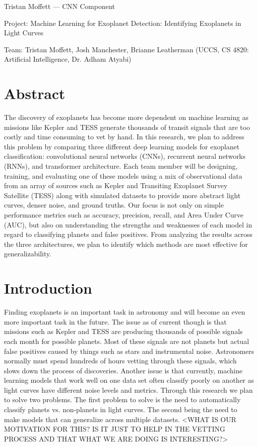 \documentclass[letterpaper]{article}
\title{}
\author{}
\begin{document}
\maketitle
Tristan Moffett — CNN Component

Project: Machine Learning for Exoplanet Detection: Identifying Exoplanets in Light Curves

Team: Tristan Moffett, Josh Manchester, Brianne Leatherman (UCCS, CS 4820: Artificial Intelligence, Dr. Adham Atyabi)

\section*{Abstract}
The discovery of exoplanets has become more dependent on machine learning as missions like Kepler and TESS generate thousands of transit signals that are too costly and time consuming to vet by hand. In this research, we plan to address this problem by comparing three different deep learning models for exoplanet classification: convolutional neural networks (CNNs), recurrent neural networks (RNNs), and transformer architecture. Each team member will be designing, training, and evaluating one of these models using a mix of observational data from an array of sources such as Kepler and Transiting Exoplanet Survey Satellite (TESS) along with simulated datasets to provide more abstract light curves, denser noise, and ground truths. Our focus is not only on simple performance metrics such as accuracy, precision, recall, and Area Under Curve (AUC), but also on understanding the strengths and weaknesses of each model in regard to classifying planets and false positives. From analyzing the results across the three architectures, we plan to identify which methods are most effective for generalizability.

\section*{Introduction}
Finding exoplanets is an important task in astronomy and will become an even more important task in the future. The issue as of current though is that missions such as Kepler and TESS are producing thousands of possible signals each month for possible planets. Most of these signals are not planets but actual false positives caused by things such as stars and instrumental noise. Astronomers normally must spend hundreds of hours vetting through these signals, which slows down the process of discoveries. Another issue is that currently, machine learning models that work well on one data set often classify poorly on another as light curves have different noise levels and metrics. Through this research we plan to solve two problems. The first problem to solve is the need to automatically classify planets vs. non-planets in light curves. The second being the need to make models that can generalize across multiple datasets. <WHAT IS OUR MOTIVATION FOR THIS? IS IT JUST TO HELP IN THE VETTING PROCESS AND THAT WHAT WE ARE DOING IS INTERESTING?>
\end{document}
